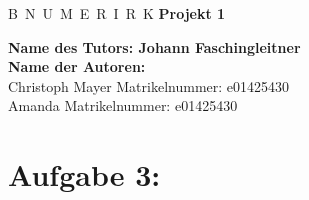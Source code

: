 \documentclass[a4paper,11pt,bibliography=totoc,listof=totoc,headinclude=true,cleardoublepage=empty,oneside]{scrbook}
\begin{document}

\begin{titlepage}
	\begin{center}
		\vskip 1cm%
		{\LARGE B~\Large N~U~M~E~R~I~R~K}
		\vskip 8mm
		{\huge\bfseries\color{change}Projekt 1}
		\vskip 1cm
		
		{\Large\bfseries\color{change}Name des Tutors: Johann Faschingleitner}\\[1ex]
		\vskip 0.5cm
		{\Large\bfseries\color{change}Name der Autoren:}\\[1ex]
		\vskip 0.5cm
		Christoph Mayer
		\vskip 0.5cm
		Matrikelnummer: {\color{change}e01425430}\\[1ex]
		\vskip 0.5cm
		Amanda
		\vskip 0.5cm
		Matrikelnummer: {\color{change}e01425430}\\[1ex]
	\end{center}
\end{titlepage}

\cleardoublepage
	
\chapter*{Aufgabe 3:} %
\thispagestyle{empty}
\end{document}
